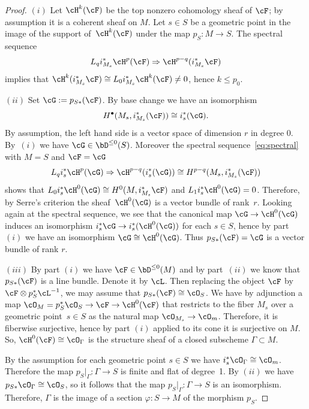 \documentclass[11pt]{amsart}
\theoremstyle{plain}
\theoremstyle{definition}
\theoremstyle{remark}
\begin{document}
\begin{proof}
$(i)$ 
Let $\cH^k(\cF)$ be the top nonzero cohomology sheaf of $\cF$; by assumption it is a coherent sheaf on $M$.
Let $s \in S$ be a geometric point in the image of the support of~$\cH^k(\cF)$ under the map $p_S \colon M \to S$.
The spectral sequence
\begin{equation}
\label{eq:spectral}
L_qi_{M_s}^*\cH^p(\cF) \Rightarrow \cH^{p-q}(i_{M_s}^*\cF)
\end{equation}
implies that $\cH^k(i_{M_s}^*\cF) \cong L_0i_{M_s}^*\cH^k(\cF) \ne 0$, hence $k \le p_0$.

$(ii)$ Set $\cG := p_{S*}(\cF)$.
By base change we have an isomorphism 
\begin{equation*}
H^\bullet(M_s,i_{M_s}^*(\cF)) \cong i_s^* (\cG).
\end{equation*}
By assumption, the left hand side is a vector space of dimension $r$ in degree $0$.
By~$(i)$ we have
$\cG \in \bD^{\le 0}(S)$.
Moreover the spectral sequence~\eqref{eq:spectral} with $M = S$ and $\cF = \cG$
\begin{equation*}
L_q i_s^* \cH^p(\cG) \Rightarrow \cH^{p-q}(i_s^*(\cG)) \cong H^{p-q}(M_s, i_{M_s}^*(\cF))
\end{equation*}
shows that $L_0i_s^*\cH^0(\cG) \cong H^0(M,i_{M_s}^*\cF)$ and $L_1i_s^*\cH^0(\cG) = 0$.
Therefore, by Serre's criterion the sheaf~$\cH^0(\cG)$ is a vector bundle of rank~$r$.
Looking again at the spectral sequence, we see that the canonical map $\cG \to \cH^0(\cG)$ induces an isomorphism $i_s^*\cG \to i_s^*(\cH^0(\cG))$ for each $s \in S$, 
hence by part $(i)$ we have an isomorphism $\cG \cong \cH^0(\cG)$.
Thus $p_{S*}(\cF) = \cG$ is a vector bundle of rank $r$.

$(iii)$ 
By part $(i)$ we have $\cF \in \bD^{\le 0}(M)$ and by part~$(ii)$ we know that $p_{S*}(\cF)$ is a line bundle.
Denote it by $\cL$.
Then replacing the object $\cF$ by~$\cF \otimes p_S^*\cL^{-1}$, we may assume that $p_{S*}(\cF) \cong \cO_S$.
We have by adjunction a map $\cO_{M} = p_S^*\cO_S \to \cF \to \cH^0(\cF)$ 
that restricts to the fiber $M_s$ over a geometric point~\mbox{$s \in S$} as the natural map $\cO_{M_s} \to \cO_m$.
Therefore, it is fiberwise surjective, hence by part $(i)$ applied to its cone it is surjective on $M$.
So, $\cH^0(\cF) \cong \cO_\Gamma$ is the structure sheaf of a closed subscheme $\Gamma \subset M$.

By the assumption for each geometric point $s \in S$ we have $i_s^*\cO_\Gamma \cong \cO_m$. 
Therefore the map $p_S\vert_\Gamma \colon \Gamma \to S$ is finite and flat of degree~1.
By $(ii)$ we have $p_{S*}\cO_\Gamma \cong \cO_S$, so it follows that the map $p_S\vert_\Gamma \colon \Gamma \to S$ is an isomorphism.
Therefore, $\Gamma$ is the image of a section $\varphi \colon S \to M$ of the morphism $p_S$.


\end{proof}
\end{document}
